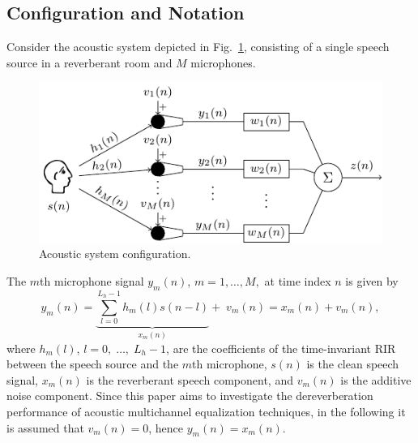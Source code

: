 \documentclass[fleqn]{aes2e}
\begin{document}
\subsection{Configuration and Notation}
Consider the acoustic system depicted in Fig.~\ref{fig: conf}, consisting of a single speech source in a reverberant room and $M$ microphones. 
\begin{figure}[b!]
  \centering
  \includegraphics[scale=0.8]{Plots/configuration}
  \caption{Acoustic system configuration.}
  \label{fig: conf}
\end{figure}
The $m$th microphone signal $y_m(n)$, $m = 1, \ldots, M,$ at time index $n$ is given by 
\begin{equation}
\!\!\!\!\!y_m(n) \!\!=\!\! \underbrace{\sum_{l = 0}^{L_h-1}h_m(l)s(n-l)}_{x_m(n)} + \; v_m(n) = x_m(n) + v_m(n),\!\!\!
\end{equation}
where $h_m(l)$, $l = 0, \; \ldots, \; L_h-1$, are the coefficients of the time-invariant RIR between the speech source and the $m$th microphone, $s(n)$ is the clean speech signal, $x_m(n)$ is the reverberant speech component, and $v_m(n)$ is the additive noise component.
Since this paper aims to investigate the dereverberation performance of acoustic multichannel equalization techniques, in the following it is assumed that $v_m(n) = 0$, hence $y_m(n) = x_m(n)$.
\end{document}
